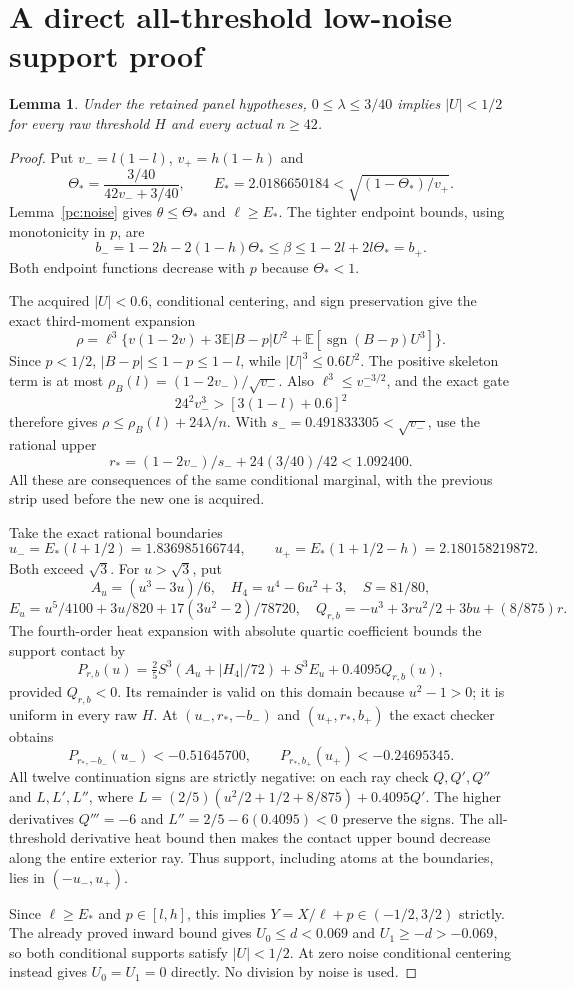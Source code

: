 \documentclass[11pt]{article}
\newcommand{\E}{\mathbb E}\newcommand{\CE}{C_{\rm E}}
\newtheorem{lemma}{Lemma}\newtheorem{proposition}{Proposition}
\begin{document}
\section{A direct all-threshold low-noise support proof}
\begin{lemma}\label{pc:direct}
Under the retained panel hypotheses, $0\le\lambda\le3/40$ implies
$|U|<1/2$ for every raw threshold $H$ and every actual $n\ge42$.
\end{lemma}
\begin{proof}
Put $v_-=l(1-l)$, $v_+=h(1-h)$ and
\[
 \Theta_* =\frac{3/40}{42v_-+3/40},\qquad
 E_*=2.0186650184<\sqrt{(1-\Theta_*)/v_+}.
\]
Lemma~\ref{pc:noise} gives $\theta\le\Theta_*$ and $\ell\ge E_*$.
The tighter endpoint bounds, using monotonicity in $p$, are
\[
 b_-=1-2h-2(1-h)\Theta_*\le\beta
       \le1-2l+2l\Theta_*=b_+.
\]
Both endpoint functions decrease with $p$ because $\Theta_*<1$.

The acquired $|U|<0.6$, conditional centering, and sign preservation give
the exact third-moment expansion
\[
 \rho=\ell^3\{v(1-2v)+3\E|B-p|U^2+
                              \E[\operatorname{sgn}(B-p)U^3]\}.
\]
Since $p<1/2$, $|B-p|\le1-p\le1-l$, while
$|U|^3\le0.6U^2$. The positive skeleton term is at most
$\rho_B(l)=(1-2v_-)/\sqrt{v_-}$. Also $\ell^3\le v_-^{-3/2}$, and
the exact gate
\[
 24^2v_-^3>[3(1-l)+0.6]^2
\]
therefore gives $\rho\le\rho_B(l)+24\lambda/n$.
With $s_- =0.491833305<\sqrt{v_-}$, use the rational upper
\[
 r_*=(1-2v_-)/s_-+24(3/40)/42
         <1.092400.
\]
All these are consequences of the same conditional marginal, with the
previous strip used before the new one is acquired.

Take the exact rational boundaries
\[
 u_-=E_*(l+1/2)=1.836985166744,\qquad
 u_+=E_*(1+1/2-h)=2.180158219872.
\]
Both exceed $\sqrt3$. For $u>\sqrt3$, put
\[
 A_u=(u^3-3u)/6,\quad H_4=u^4-6u^2+3,\quad S=81/80,
\]
\[
 E_u=u^5/4100+3u/820+17(3u^2-2)/78720,
 \quad Q_{r,b}=-u^3+3ru^2/2+3bu+(8/875)r.
\]
The fourth-order heat expansion with absolute quartic coefficient bounds
the support contact by
\[
 P_{r,b}(u)=\tfrac25S^3(A_u+|H_4|/72)+S^3E_u
                           +0.4095Q_{r,b}(u),
\]
provided $Q_{r,b}<0$. Its remainder is valid on this domain because
$u^2-1>0$; it is uniform in every raw $H$.
At $(u_-,r_*,-b_-)$ and $(u_+,r_*,b_+)$ the exact checker obtains
\[
 P_{r_*,-b_-}(u_-)<-0.51645700,\qquad
 P_{r_*,b_+}(u_+)<-0.24695345.
\]
All twelve continuation signs are strictly negative: on each ray check
$Q,Q',Q''$ and $L,L',L''$, where
$L=(2/5)(u^2/2+1/2+8/875)+0.4095Q'$.
The higher derivatives $Q'''=-6$ and $L''=2/5-6(0.4095)<0$
preserve the signs. The all-threshold derivative heat bound then makes
the contact upper bound decrease along the entire exterior ray.
Thus support, including atoms at the boundaries, lies in $(-u_-,u_+)$.

Since $\ell\ge E_*$ and $p\in[l,h]$, this implies
$Y=X/\ell+p\in(-1/2,3/2)$ strictly. The already proved inward bound
gives $U_0\le d<0.069$ and $U_1\ge-d>-0.069$, so both conditional
supports satisfy $|U|<1/2$. At zero noise conditional centering instead
gives $U_0=U_1=0$ directly. No division by noise is used.
\end{proof}
\end{document}
